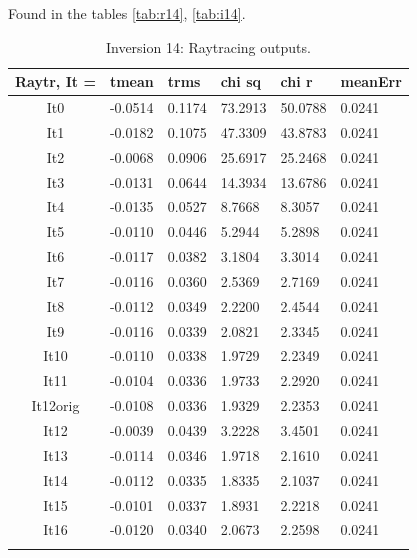 \documentclass[fontsize=11pt, %
                             paper=a4, %
                             twoside, %
                             captions=tableheading,
                             index=totoc,
                             hyperref]{labbook}
\begin{document}
\begin{addmargin}[4cm]{0cm}

Found in the tables \autoref{tab:r14}, \autoref{tab:i14}.
\begin{table}[ht]
\label{tab:r14}
\raggedleft
\begin{tabular}{c l l l l l}
\toprule
\textbf{Raytr, It = } & \textbf{tmean} & \textbf{trms} & \textbf{chi sq} & \textbf{chi r} & \textbf{meanErr} \\
\toprule
It0 & -0.0514 & 0.1174 & 73.2913 & 50.0788 & 0.0241\\
It1 & -0.0182 & 0.1075 & 47.3309 & 43.8783 & 0.0241\\
It2 & -0.0068 & 0.0906 & 25.6917 & 25.2468 & 0.0241\\
It3 & -0.0131 & 0.0644 & 14.3934 & 13.6786 & 0.0241\\
It4 & -0.0135 &  0.0527 & 8.7668 & 8.3057 & 0.0241\\
It5 & -0.0110 & 0.0446 & 5.2944 & 5.2898 & 0.0241\\
It6 & -0.0117 & 0.0382 & 3.1804 & 3.3014 & 0.0241\\
It7 & -0.0116 & 0.0360 & 2.5369 & 2.7169 & 0.0241\\
It8 & -0.0112 & 0.0349 & 2.2200 & 2.4544 & 0.0241\\
It9 & -0.0116 & 0.0339 & 2.0821 & 2.3345 & 0.0241\\
It10 & -0.0110 & 0.0338 & 1.9729 & 2.2349 & 0.0241\\
It11 & -0.0104 & 0.0336 & 1.9733 & 2.2920 & 0.0241\\
It12orig & -0.0108 & 0.0336 & 1.9329 & 2.2353 & 0.0241\\
It12 & -0.0039 & 0.0439 & 3.2228 & 3.4501 & 0.0241\\
It13 & -0.0114 & 0.0346 & 1.9718 & 2.1610 & 0.0241\\
It14 & -0.0112 & 0.0335 & 1.8335 & 2.1037 & 0.0241\\
It15 & -0.0101 & 0.0337 & 1.8931 & 2.2218 & 0.0241\\
It16 & -0.0120 & 0.0340 & 2.0673 & 2.2598 &  0.0241\\
\bottomrule\\
\end{tabular}
\caption{Inversion 14: Raytracing outputs.}
\end{table}


\end{addmargin}
\end{document}
